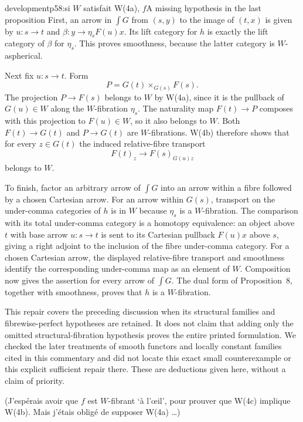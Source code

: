 \begin{dcomment}{development}{p58:si $W$ satisfait W(4a), $f$}{A missing hypothesis in the last proposition}
First, an arrow in $\int G$ from $(s,y)$ to the image of $(t,x)$ is given by $u:s\to t$ and $\beta:y\to\eta_sF(u)x$. Its lift category for $h$ is exactly the lift category of $\beta$ for $\eta_s$. This proves smoothness, because the latter category is $W$-aspherical.

Next fix $u:s\to t$. Form
\[
 P=G(t)\times_{G(s)}F(s).
\]
The projection $P\to F(s)$ belongs to $W$ by W(4a), since it is the pullback of $G(u)\in W$ along the $W$-fibration $\eta_s$. The naturality map $F(t)\to P$ composes with this projection to $F(u)\in W$, so it also belongs to $W$. Both $F(t)\to G(t)$ and $P\to G(t)$ are $W$-fibrations. W(4b) therefore shows that for every $z\in G(t)$ the induced relative-fibre transport
\[
 F(t)_z\longrightarrow F(s)_{G(u)z}
\]
belongs to $W$.

To finish, factor an arbitrary arrow of $\int G$ into an arrow within a fibre followed by a chosen Cartesian arrow. For an arrow within $G(s)$, transport on the under-comma categories of $h$ is in $W$ because $\eta_s$ is a $W$-fibration. The comparison with its total under-comma category is a homotopy equivalence: an object above $t$ with base arrow $u:s\to t$ is sent to its Cartesian pullback $F(u)x$ above $s$, giving a right adjoint to the inclusion of the fibre under-comma category. For a chosen Cartesian arrow, the displayed relative-fibre transport and smoothness identify the corresponding under-comma map as an element of $W$. Composition now gives the assertion for every arrow of $\int G$. The dual form of Proposition~8, together with smoothness, proves that $h$ is a $W$-fibration.

This repair covers the preceding discussion when its structural families and fibrewise-perfect hypotheses are retained. It does not claim that adding only the omitted structural-fibration hypothesis proves the entire printed formulation. We checked the later treatments of smooth functors and locally constant families cited in this commentary and did not locate this exact small counterexample or this explicit sufficient repair there. These are deductions given here, without a claim of priority.
\end{dcomment}


(J'espérais avoir que $f$ est $W$-fibrant `à l'\oe{}il', pour prouver que W(4c) implique W(4b). Mais j'étais obligé de supposer W(4a) \dots)


